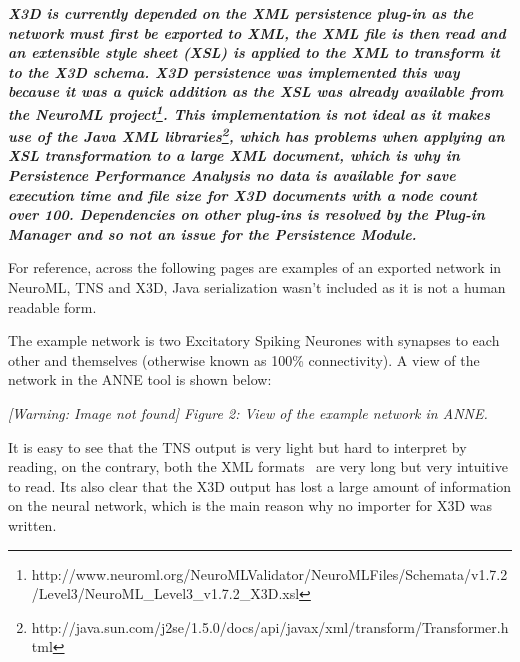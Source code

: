 \documentclass[12pt,twoside]{article}
\begin{document}
\bigskip

{\bfseries\itshape
\textmd{\textup{X3D is currently depended on the XML persistence
plug{}-in as the network must first be exported to XML, the XML file is
then read and an extensible style sheet (XSL) is applied to the XML to
transform it to the X3D schema. X3D persistence was implemented this
way because it was a quick addition as the XSL was already available
from the NeuroML
project}}\footnote{http://www.neuroml.org/NeuroMLValidator/NeuroMLFiles/Schemata/v1.7.2/Level3/NeuroML\_Level3\_v1.7.2\_X3D.xsl}\textmd{\textup{.
This implementation is not ideal as it makes use of the Java XML
libraries}}\footnote{http://java.sun.com/j2se/1.5.0/docs/api/javax/xml/transform/Transformer.html}\textmd{\textup{,
which has problems when applying an XSL transformation to a large XML
document, which is why in Persistence Performance Analysis no data is
available for save execution time and file size for X3D documents with
a node count over 100. Dependencies on other plug{}-ins is resolved by
the Plug{}-in Manager and so not an issue for the Persistence
Module.}}}


{\mdseries\upshape
For reference, across the following pages are examples of an exported
network in NeuroML, TNS and X3D, Java serialization
wasn't included as it is not a human readable form.}


\bigskip

{\mdseries\upshape
The example network is two Excitatory Spiking Neurones with synapses to
each other and themselves (otherwise known as 100\% connectivity). A
view of the network in the ANNE tool is shown below:}


\bigskip

{\upshape
}

\begin{center}
\begin{minipage}{17cm}
{\raggedleft\itshape
 [Warning: Image not found] Figure 2: View of the example network in
ANNE.
\par}
\end{minipage}\end{center}
{\upshape
It is easy to see that the TNS output is very light but hard to
interpret by reading, on the contrary, both the XML formats \ are very
long but very intuitive to read. Its also clear that the X3D output has
lost a large amount of information on the neural network, which is the
main reason why no importer for X3D was written.}
\end{document}
